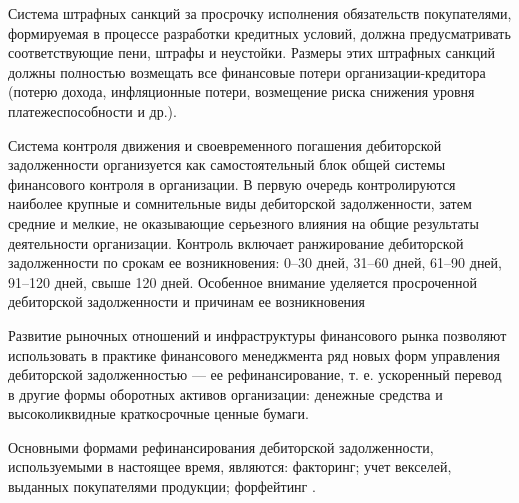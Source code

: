 Система штрафных санкций за просрочку исполнения обязательств покупателями, формируемая в процессе разработки кредитных условий, должна предусматривать соответствующие пени, штрафы и неустойки.
Размеры этих штрафных санкций должны полностью возмещать все финансовые потери организации-кредитора (потерю дохода, инфляционные потери, возмещение риска снижения уровня платежеспособности и др.).

Система контроля движения и своевременного погашения дебиторской задолженности организуется как самостоятельный блок общей системы финансового контроля в организации.
В первую очередь контролируются наиболее крупные и сомнительные виды дебиторской задолженности, затем средние и мелкие, не оказывающие серьезного влияния на общие результаты деятельности организации.
Контроль включает ранжирование дебиторской задолженности по срокам ее возникновения: 0--30 дней, 31--60 дней, 61--90 дней, 91--120 дней, свыше 120 дней.
Особенное внимание уделяется просроченной дебиторской задолженности и причинам ее возникновения

Развитие рыночных отношений и инфраструктуры финансового рынка позволяют использовать в практике финансового менеджмента ряд новых форм управления дебиторской задолженностью --- ее рефинансирование, т. е. ускоренный перевод в другие формы оборотных активов организации: денежные средства и высоколиквидные краткосрочные ценные бумаги.

Основными формами рефинансирования дебиторской задолженности, используемыми в настоящее время, являются: факторинг; учет векселей, выданных покупателями продукции; форфейтинг \cite[361--368]{kirichenko}.